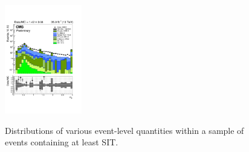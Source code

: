 \begin{figure}[h!]
\begin{center}
    \includegraphics[width=0.3\textwidth,page=12,trim=0 100 50 100,clip]{figures/SITV/Event/Event.pdf}\\
    \caption{Distributions of various event-level quantities within a
      sample of \mj events containing at least SIT.}
    \label{fig:dataMC_SITEvent_mu}
  \end{center} 
\end{figure}
